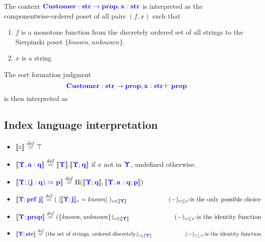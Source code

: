 \documentclass{article}
\newcommand{\blu}[1]{\mathbf{\color{blue}{#1}}}
\newcommand{\sem}[1]{\llbracket #1 \rrbracket}
\newcommand{\defeq}{\overset{\mathit{def}}{=}}
\begin{document}
The context $\blu{Customer : str \to prop,x:str}$ is interpreted as the componentwise-ordered poset of all pairs $(f,x)$ such that
\begin{enumerate}
\item $f$ is a monotone function from the discretely ordered set of all strings to the Sierpinski poset $\{ \mathit{known}, \mathit{unknown} \}$.
\item $x$ is a string
\end{enumerate}
The sort formation judgment
$$\blu{Customer : str \to prop,x:str} \vdash \blu{prop}$$ 
is then interpreted as 

\subsection*{Index language interpretation}

\begin{itemize}
\item $\sem{\blu{\diamond}} \defeq \top$
\item $\sem{\blu{\Upsilon,a:q}} \defeq \sem{\blu{\Upsilon}}.\sem{\blu{\Upsilon};\blu{q}}$ if $x$ not in $\blu{\Upsilon}$, undefined otherwise.
\item $\sem{\blu{\Upsilon}; \blu{(j : q) \Rightarrow p}} \defeq \Pi(\sem{\blu{\Upsilon};\blu{q}},\sem{\blu{\Upsilon,a:q};\blu{p}})$
\item $\sem{\blu{\Upsilon}; \blu{\mathbf{prf}~j}} \defeq (~[ \sem{\blu{\Upsilon}; \blu{j}}_\upsilon = \mathit{known} ]~)_{\upsilon \in \sem{\blu{\Upsilon}}}\\ ~~~~~~~~~~~~~~~~~~~~(-)_{\upsilon \leq \upsilon'} \text{is the only possible choice}$
\item $\sem{\blu{\Upsilon}; \blu{prop}} \defeq ( \{ \mathit{known}, \mathit{unknown} \} )_{\upsilon \in \sem{\blu{\Upsilon}}}  \\ ~~~~~~~~~~~~~~~~~~~~~(-)_{\upsilon \leq \upsilon'} \text{is the identity function}$
\item $\sem{\blu{\Upsilon}; \blu{str}} \defeq (\text{the set of strings, ordered discretely})_{\upsilon \in \sem{\blu{\Upsilon}}} \\ ~~~~~~~~~~~~~~~~~~(-)_{\upsilon \leq \upsilon'} \text{is the identity function}$
\end{itemize}
\end{document}

